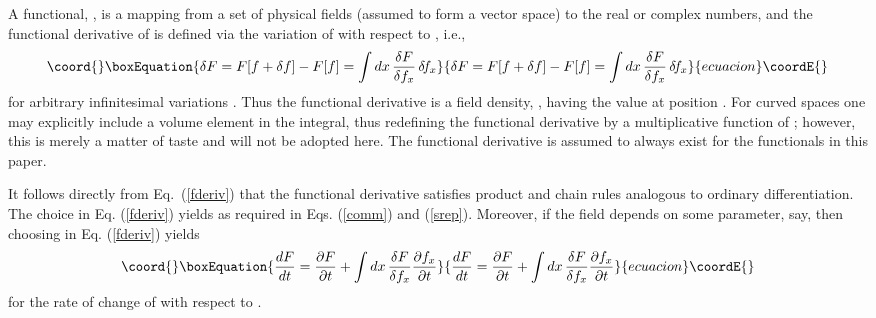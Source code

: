 \documentclass[a4paper,preprint, showpacs, aps, draft]{revtex4}
\begin{document}
{{A functional, \coordHE{}, is a mapping from a set of physical fields
(assumed to form a vector space) to the real or complex numbers, and the
functional derivative of \coordHE{} is defined via the variation of \coordHE{} with
respect to \coordHE{}, i.e., 
\begin{equation}\coord{}\boxEquation{ \label{fderiv}
\delta F= 
F[f+\delta f] - F[f] = \int dx\, \frac{\delta F}{\delta f_x}\, \delta\!f_x
}{ \delta F= 
F[f+\delta f] - F[f] = \int dx\, \frac{\delta F}{\delta f_x}\, \delta\!f_x
}{ecuacion}\coordE{}\end{equation}
for arbitrary infinitesimal variations \coordHE{}.  Thus the functional
derivative is a 
field density, \coordHE{}, having the value \coordHE{} at position \coordHE{}.  For curved spaces one may explicitly 
include a volume element in the integral, thus redefining the functional
derivative by a multiplicative function of \coordHE{}; however, this is 
merely a matter of taste
and will not be adopted here.  The functional derivative is
assumed to always exist for the functionals in this paper.

It follows directly from Eq.~(\ref{fderiv}) that the functional
derivative satisfies product and chain rules analogous to ordinary
differentiation. The choice \coordHE{} in Eq.
(\ref{fderiv}) yields
\coordHE{} as required in Eqs.
(\ref{comm}) and (\ref{srep}). 
Moreover, if the field depends on some parameter, \coordHE{} say, then
choosing \coordHE{} in Eq. (\ref{fderiv})
yields
\begin{equation}\coord{}\boxEquation{ \label{rate}
\frac{dF}{dt} = \frac{\partial F}{\partial t} + \int dx\,\frac{\delta
F}{\delta f_x} \frac{\partial f_x}{\partial t} 
}{ \frac{dF}{dt} = \frac{\partial F}{\partial t} + \int dx\,\frac{\delta
F}{\delta f_x} \frac{\partial f_x}{\partial t} 
}{ecuacion}\coordE{}\end{equation}
for the rate of change of \coordHE{} with respect to \coordHE{}.

}}
\end{document}
